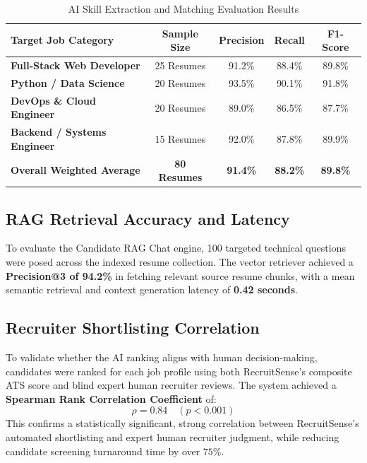\begin{table}[h!]
\centering
\small
\caption{AI Skill Extraction and Matching Evaluation Results}
\label{tab:ai_eval_results_full}
\begin{tabular}{|l|c|c|c|c|}
\hline
\textbf{Target Job Category} & \textbf{Sample Size} & \textbf{Precision} & \textbf{Recall} & \textbf{F1-Score} \\ \hline
\textbf{Full-Stack Web Developer} & 25 Resumes & 91.2\% & 88.4\% & 89.8\% \\ \hline
\textbf{Python / Data Science} & 20 Resumes & 93.5\% & 90.1\% & 91.8\% \\ \hline
\textbf{DevOps \& Cloud Engineer} & 20 Resumes & 89.0\% & 86.5\% & 87.7\% \\ \hline
\textbf{Backend / Systems Engineer} & 15 Resumes & 92.0\% & 87.8\% & 89.9\% \\ \hline
\textbf{Overall Weighted Average} & \textbf{80 Resumes} & \textbf{91.4\%} & \textbf{88.2\%} & \textbf{89.8\%} \\ \hline
\end{tabular}
\end{table}

\subsection{RAG Retrieval Accuracy and Latency}
To evaluate the Candidate RAG Chat engine, 100 targeted technical questions were posed across the indexed resume collection. The vector retriever achieved a \textbf{Precision@3 of 94.2\%} in fetching relevant source resume chunks, with a mean semantic retrieval and context generation latency of \textbf{0.42 seconds}.

\subsection{Recruiter Shortlisting Correlation}
To validate whether the AI ranking aligns with human decision-making, candidates were ranked for each job profile using both RecruitSense's composite ATS score and blind expert human recruiter reviews. The system achieved a \textbf{Spearman Rank Correlation Coefficient} of:
\begin{equation}
    \rho = 0.84 \quad (p < 0.001)
\end{equation}
This confirms a statistically significant, strong correlation between RecruitSense's automated shortlisting and expert human recruiter judgment, while reducing candidate screening turnaround time by over $75\%$.

